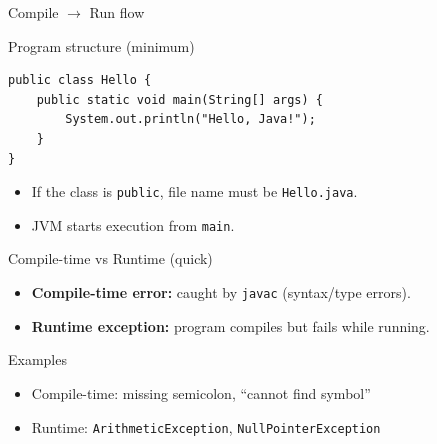 \documentclass{beamer}
\begin{document}
\begin{frame}{Compile $\rightarrow$ Run flow}
  \begin{center}
  \end{center}
  \slidesources{\OOPSUnitISources}
\end{frame}

\begin{frame}[fragile]{Program structure (minimum)}
\begin{lstlisting}
public class Hello {
    public static void main(String[] args) {
        System.out.println("Hello, Java!");
    }
}
\end{lstlisting}
  \begin{itemize}[<+->]
    \item If the class is \texttt{public}, file name must be \texttt{Hello.java}.
    \item JVM starts execution from \texttt{main}.
  \end{itemize}
  \slidesources{\OOPSUnitISources}
\end{frame}

\begin{frame}{Compile-time vs Runtime (quick)}
  \begin{itemize}[<+->]
    \item \textbf{Compile-time error:} caught by \texttt{javac} (syntax/type errors).
    \item \textbf{Runtime exception:} program compiles but fails while running.
  \end{itemize}
  \vspace{0.4em}
  \begin{block}{Examples}
    \begin{itemize}
      \item Compile-time: missing semicolon, ``cannot find symbol''
      \item Runtime: \texttt{ArithmeticException}, \texttt{NullPointerException}
    \end{itemize}
  \end{block}
  \slidesources{\OOPSUnitISources}
\end{frame}
\end{document}
